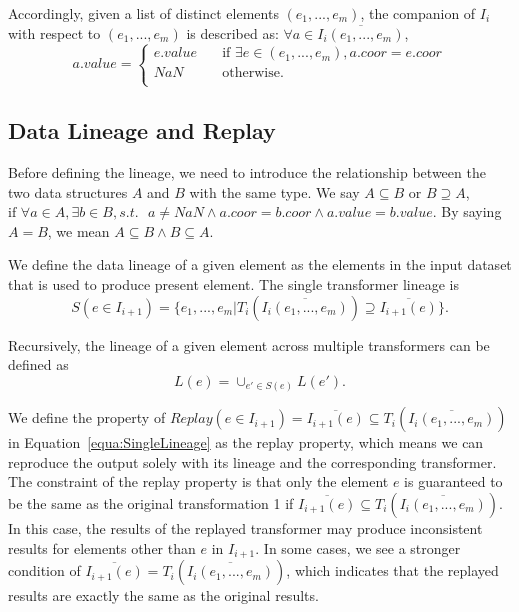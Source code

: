 \documentclass{sig-alternate}
\begin{document}
Accordingly, given a list of distinct elements $(e_1, ..., e_m)$, the companion of $I_i$ with respect to $(e_1, ..., e_m)$ is
described as: $\forall a \in \overline{I_i(e_1, ..., e_m)}$, 
\[ a.value =
  \begin{cases}
    e.value       & \quad \text{if } \exists e \in (e_1,...,e_m), a.coor = e.coor\\
    NaN  & \quad \text{otherwise}. \\
  \end{cases}
\]


\subsection{Data Lineage and Replay}
Before defining the lineage, we need to introduce the relationship between the two data structures $A$ and $B$ with the same type.
We say $A \subseteq B \text{ or } B \supseteq A$, $\text{if }\forall a \in A, \exists b \in B, s.t.\text{ } a \neq NaN \land a.coor = b.coor \land a.value = b.value$.
By saying $A = B$, we mean $A \subseteq B \land B \subseteq A$.

We define the data lineage of a given element as the elements in the input dataset that is used to produce present element.
The single transformer lineage is
\begin{equation}
S(e \in I_{i+1}) = \{e_1, ..., e_m | T_i(\overline{I_i(e_1, ..., e_m)}) \supseteq \overline{I_{i+1}(e)}\}.
\label{equa:SingleLineage}
\end{equation}


Recursively, the lineage of a given element across multiple transformers can be defined as
\begin{equation}
L(e) = \cup_{e' \in S(e)} L(e').
\end{equation}

We define the property of $Replay(e \in I_{i+1}) = \overline{I_{i+1}(e)} \subseteq T_i(\overline{I_i(e_1, ..., e_m)})$ in Equation~\ref{equa:SingleLineage}
as the replay property, which means we can reproduce the output solely with its lineage and the corresponding transformer.
The constraint of the replay property is that only the element $e$ is guaranteed to be the same as the original transformation 1
if $\overline{I_{i+1}(e)} \subseteq T_i(\overline{I_i(e_1, ..., e_m)})$. In this case, the results of the replayed transformer may
produce inconsistent results for elements other than $e$ in $I_{i+1}$. 
In some cases, we see a stronger condition of $\overline{I_{i+1}(e)} = T_i(\overline{I_i(e_1, ..., e_m)})$, which indicates that
the replayed results are exactly the same as the original results.
\end{document}
